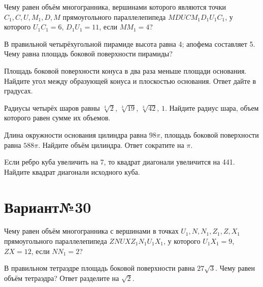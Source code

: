 \documentclass[4apaper]{article}
\begin{document}
\begin{taskBN}{1}
Чему равен объём многогранника, вершинами которого являются точки $C_1,C,U,M_1,D,M$ прямоугольного параллелепипеда $MDUCM_1D_1U_1C_1$, у которого $U_1C_1 = 6$, $D_1U_1 = 11$, если $MM_1=4$? 
\end{taskBN}

\begin{taskBN}{2}
В правильной четырёхугольной пирамиде высота равна 4; апофема составляет 5. Чему равна площадь боковой поверхности пирамиды?
\end{taskBN}

\begin{taskBN}{3}
Площадь боковой поверхности конуса в два раза меньше площади основания. Найдите угол между образующей конуса и плоскостью основания. Ответ дайте в градусах.
\end{taskBN}

\begin{taskBN}{4}
Радиусы четырёх шаров равны $\sqrt[3]{2}$, $\sqrt[3]{19}$, $\sqrt[3]{42}$, $1$. Найдите радиус шара, объем которого равен сумме их объемов.
\end{taskBN}

\begin{taskBN}{5}
Длина окружности основания цилиндра равна $98\pi$, площадь боковой поверхности равна $588\pi$. Найдите объём цилиндра. Ответ сократите на $\pi$.
\end{taskBN}

\begin{taskBN}{6}
Eсли ребро куба увеличить на 7, то квадрат диагонали увеличится на 441. Найдите квадрат диагонали исходного куба.
\end{taskBN}
\newpage\section*{Вариант№30}

\begin{taskBN}{1}
Чему равен объём многогранника с вершинами в точках $U_1,N,N_1,Z_1,Z,X_1$ прямоугольного параллелепипеда $ZNUXZ_1N_1U_1X_1$, у которого $U_1X_1 = 9$, $ZX = 12$, если $NN_1=2$? 
\end{taskBN}

\begin{taskBN}{2}
В правильном тетраэдре площадь боковой поверхности равна $27\sqrt{3}$. Чему равен объём тетраэдра? Ответ разделите на $\sqrt{2}$.
\end{taskBN}
\end{document}
